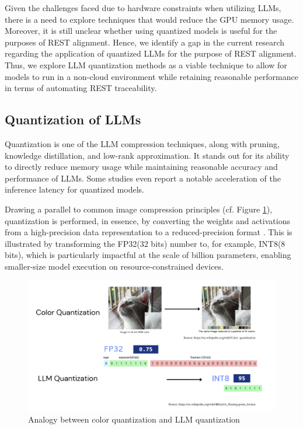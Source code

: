 \documentclass[conference]{IEEEtran}
\begin{document}
Given the challenges faced due to hardware constraints when utilizing LLMs, there is a need to explore techniques that would reduce the GPU memory usage. Moreover, it is still unclear whether using quantized models is useful for the purposes of REST alignment. Hence, we identify a gap in the current research regarding the application of quantized LLMs for the purpose of REST alignment. Thus, we explore LLM quantization methods as a viable technique to allow for models to run in a non-cloud environment while retaining reasonable performance in terms of automating REST traceability.

\subsection{Quantization of LLMs}

Quantization is one of the LLM compression techniques, along with pruning, knowledge distillation, and low-rank approximation\cite{bai2024beyond}. It stands out for its ability to directly reduce memory usage while maintaining reasonable accuracy and performance of LLMs. Some studies even report a notable acceleration of the inference latency for quantized models\cite{shen2024exploring}.

Drawing a parallel to common image compression principles (cf. Figure \ref{fig:quantvisual}), quantization is performed, in essence, by converting the weights and activations from a high-precision data representation to a reduced-precision format \cite{zhao2025benchmarking, bai2024beyond}. This is illustrated by transforming the FP32(32 bits) number to, for example, INT8(8 bits), which is particularly impactful at the scale of billion parameters, enabling smaller-size model execution on resource-constrained devices.

\begin{figure}[ht]
\includegraphics[width=\columnwidth]{img}
    \caption{Analogy between color quantization and LLM quantization}
    \label{fig:quantvisual}
\end{figure}
\end{document}
